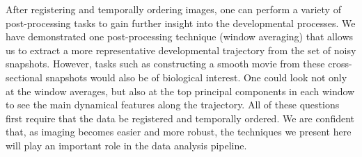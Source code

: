 \documentclass{pnastwo}
\begin{document}
\begin{article}
After registering and temporally ordering images, one can perform a variety of post-processing tasks to gain further insight into the developmental processes.
%
We have demonstrated one post-processing technique (window averaging) that allows us to extract a more representative developmental trajectory from the set of noisy snapshots. 
%
However, tasks such as constructing a smooth movie from these cross-sectional snapshots would also be of biological interest.
%
One could look not only at the window averages, but also at the top principal components in each window to see the main dynamical features along the trajectory.
%
All of these questions first require that the data be registered and temporally ordered.
%
We are confident that, as imaging becomes easier and more robust, the techniques we present here will play an important role in the data analysis pipeline. 


 






\end{article}
\end{document}
